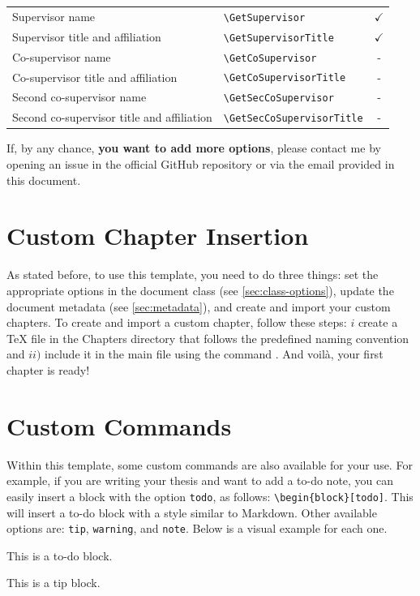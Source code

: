 \begin{longtable}[c]{llc}
Supervisor name                  & \verb|\GetSupervisor|        & $\checkmark$ \\
Supervisor title and affiliation & \verb|\GetSupervisorTitle|   & $\checkmark$ \\ 

Co-supervisor name                  & \verb|\GetCoSupervisor|       & - \\
Co-supervisor title and affiliation & \verb|\GetCoSupervisorTitle|  & - \\ 

Second co-supervisor name                   & \verb|\GetSecCoSupervisor|      & - \\
Second co-supervisor title and affiliation  & \verb|\GetSecCoSupervisorTitle| & - \\
\end{longtable}

If, by any chance, \textbf{you want to add more options}, please contact me by opening an issue in the official GitHub repository or via the email provided in this document.

\section{Custom Chapter Insertion}
As stated before, to use this template, you need to do three things: set the appropriate options in the document class (see \autoref{sec:class-options}), update the document metadata (see \autoref{sec:metadata}), and create and import your custom chapters. To create and import a custom chapter, follow these steps: \(i\) create a TeX file in the Chapters directory that follows the predefined naming convention and \(ii)\) include it in the main file using the command \verb||. And voilà, your first chapter is ready!

\section{Custom Commands}
Within this template, some custom commands are also available for your use. For example, if you are writing your thesis and want to add a to-do note, you can easily insert a block with the option \verb|todo|, as follows: \verb|\begin{block}[todo]|. This will insert a to-do block with a style similar to Markdown. Other available options are: \verb|tip|, \verb|warning|, and \verb|note|. Below is a visual example for each one.

\vspace{.875em}
\begin{tcbraster}[
    raster columns=2, 
    raster equal height, 
    nobeforeafter, 
    raster column skip=1cm
]
\begin{block}[todo]
    This is a to-do block.
\end{block}
\begin{block}[tip]
    This is a tip block.
\end{block}
\end{tcbraster}

